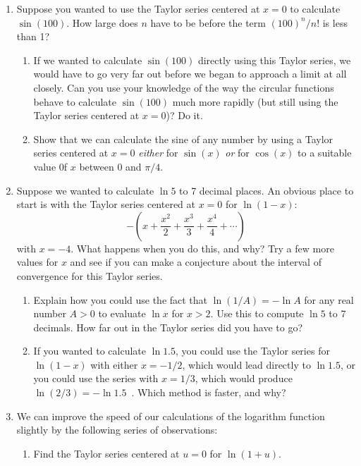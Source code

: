 \begin{enumerate}
\item Suppose you wanted to use the Taylor series centered at $x=0$ to
calculate $\sin(100)$.  How large does $n$ have to be before the term
$(100)^n/{n!}$ is less than 1?

  \begin{enumerate}
  \item If we wanted to calculate $\sin(100)$ directly using this Taylor
series, we would have to go very far out before we began to approach a
limit at all closely.  Can you use your knowledge of the way the
circular functions behave to calculate $\sin(100)$ much more rapidly
(but still using the Taylor series centered at $x=0$)?  Do it.

  \item Show that we can calculate the sine of any number by using a
Taylor series centered at $x=0$ {\em either} for $\sin(x)$ {\em or}
for $\cos(x)$ to a suitable value 0f $x$ between 0 and $\pi/4$.


\end{enumerate}
\item Suppose we wanted to calculate $\ln{5}$ to 7 decimal places. An
obvious place to start is with the Taylor series centered at $x=0$ for
$\ln(1-x)$:
\[
-\left(x + \dfrac{x^2}{2} + \dfrac{x^3}{3} + \dfrac{x^4}{4} 
       + \cdots \right)
\]
with $x=-4$.  What happens when you do this, and why?  Try a few more
values for $x$ and see if you can make a conjecture about the interval
of convergence for this Taylor series.



  \begin{enumerate}
  \item Explain how you could use the fact that $\ln(1/A)=-\ln{A}$ for
any real number $A>0$ to evaluate $\ln{x}$ for $x>2$.  Use this to
compute $\ln{5}$ to 7 decimals.  How far out in the Taylor series did
you have to go?

  \item If you wanted to calculate $\ln 1.5$, you could use the Taylor
series for $\ln(1-x)$ with either $x=-1/2$, which would lead directly
to $\ln 1.5$, or you could use the series with $x=1/3$, which would
produce $\ln(2/3) = -\ln 1.5$\, .  Which method is faster, and why?


\end{enumerate}
\item We can improve the speed of our calculations of the logarithm
function slightly by the following series of observations: 
  \begin{enumerate}
  \item Find
the Taylor series centered at $u=0$ for $\ln(1+u)$.


\end{enumerate}
\end{enumerate}

